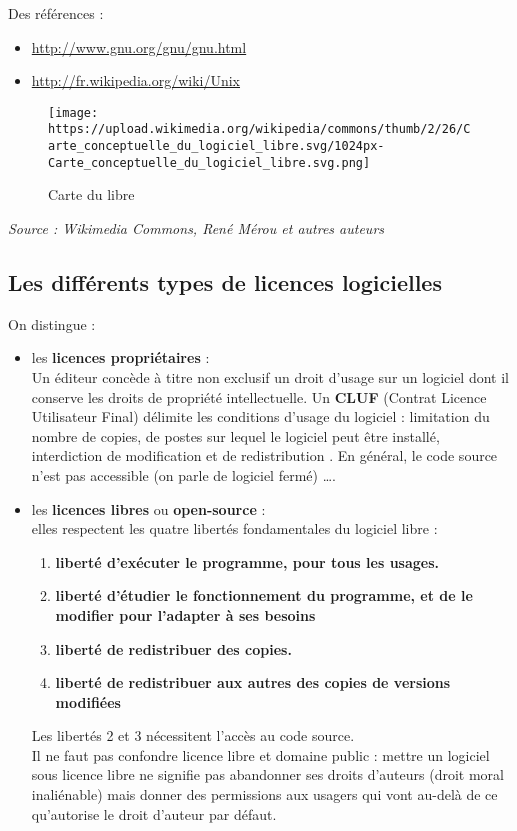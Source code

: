 \documentclass[
  11pt,
]{article}
\newcounter{prop}
\newcounter{def}
\newcounter{prog}
\newcounter{logi}
\begin{document}
Des références :

\begin{itemize}
\item
  \url{http://www.gnu.org/gnu/gnu.html}
\item
  \url{http://fr.wikipedia.org/wiki/Unix}
\end{itemize}

\begin{figure}
\centering
\texttt{[image: https://upload.wikimedia.org/wikipedia/commons/thumb/2/26/Carte\_conceptuelle\_du\_logiciel\_libre.svg/1024px-Carte\_conceptuelle\_du\_logiciel\_libre.svg.png]}
\caption{Carte du libre}
\end{figure}

\emph{Source : Wikimedia Commons, René Mérou et autres auteurs}

\hypertarget{les-diffuxe9rents-types-de-licences-logicielles}{%
\subsection{Les différents types de licences
logicielles}\label{les-diffuxe9rents-types-de-licences-logicielles}}

On distingue :

\begin{itemize}
\item
  les \textbf{licences propriétaires} :\\
  Un éditeur concède à titre non exclusif un droit d'usage sur un
  logiciel dont il conserve les droits de propriété intellectuelle. Un
  \textbf{CLUF} (Contrat Licence Utilisateur Final) délimite les
  conditions d'usage du logiciel : limitation du nombre de copies, de
  postes sur lequel le logiciel peut être installé, interdiction de
  modification et de redistribution . En général, le code source n'est
  pas accessible (on parle de logiciel fermé) \ldots.
\item
  les \textbf{licences libres} ou \textbf{open-source} :\\
  elles respectent les quatre libertés fondamentales du logiciel libre :

  \begin{enumerate}
  \def\labelenumi{\arabic{enumi}.}
  \item
    \textbf{liberté d'exécuter le programme, pour tous les usages.}
  \item
    \textbf{liberté d'étudier le fonctionnement du programme, et de le
    modifier pour l'adapter à ses besoins}
  \item
    \textbf{liberté de redistribuer des copies.}
  \item
    \textbf{liberté de redistribuer aux autres des copies de versions
    modifiées}
  \end{enumerate}

  Les libertés 2 et 3 nécessitent l'accès au code source.\\
  Il ne faut pas confondre licence libre et domaine public : mettre un
  logiciel sous licence libre ne signifie pas abandonner ses droits
  d'auteurs (droit moral inaliénable) mais donner des permissions aux
  usagers qui vont au-delà de ce qu'autorise le droit d'auteur par
  défaut.
\end{itemize}
\end{document}
